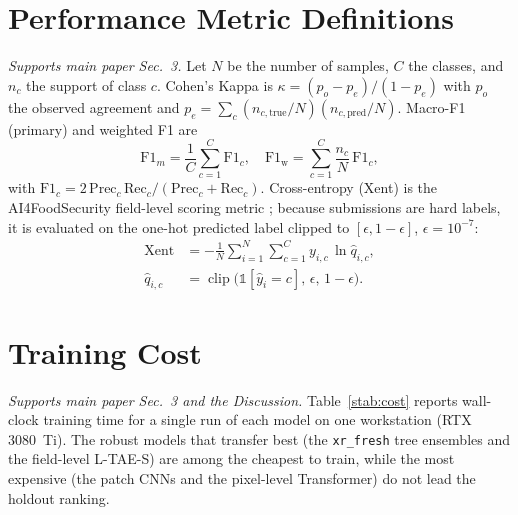 \documentclass[preprint,authoryear,3p]{elsarticle}
\begin{document}
\section{Performance Metric Definitions}
\label{sec:smetrics}
\emph{Supports main paper Sec.~3.}
Let $N$ be the number of samples, $C$ the classes, and $n_c$ the support of class $c$. Cohen's Kappa
is $\kappa = (p_o - p_e)/(1 - p_e)$ with $p_o$ the observed agreement and
$p_e=\sum_c (n_{c,\text{true}}/N)(n_{c,\text{pred}}/N)$. Macro-F1 (primary) and weighted F1 are
\begin{equation}
\mathrm{F1}_{m} = \frac{1}{C}\sum_{c=1}^{C}\mathrm{F1}_c,
\quad
\mathrm{F1}_{\text{w}} = \sum_{c=1}^{C}\frac{n_c}{N}\,\mathrm{F1}_c,
\end{equation}
with $\mathrm{F1}_c = 2\,\mathrm{Prec}_c\,\mathrm{Rec}_c/(\mathrm{Prec}_c+\mathrm{Rec}_c)$.
Cross-entropy (Xent) is the AI4FoodSecurity field-level scoring metric \citep{ai4foodsecurity};
because submissions are hard labels, it is evaluated on the one-hot predicted label clipped to
$[\epsilon,1-\epsilon]$, $\epsilon=10^{-7}$:
\begin{equation}
\begin{aligned}
\mathrm{Xent} &= -\frac{1}{N}\sum_{i=1}^N \sum_{c=1}^{C} y_{i,c}\,\ln\hat{q}_{i,c},\\
\hat{q}_{i,c} &= \operatorname{clip}\!\big(\mathbb{1}[\hat{y}_i = c],\,\epsilon,\,1-\epsilon\big).
\end{aligned}
\end{equation}

\section{Training Cost}
\label{sec:cost}
\emph{Supports main paper Sec.~3 and the Discussion.}
Table~\ref{stab:cost} reports wall-clock training time for a single run of each model on one
workstation (RTX 3080~Ti). The robust models that transfer best (the \texttt{xr\_fresh} tree
ensembles and the field-level L-TAE-S) are among the cheapest to train, while the most expensive
(the patch CNNs and the pixel-level Transformer) do not lead the holdout ranking.
\end{document}
